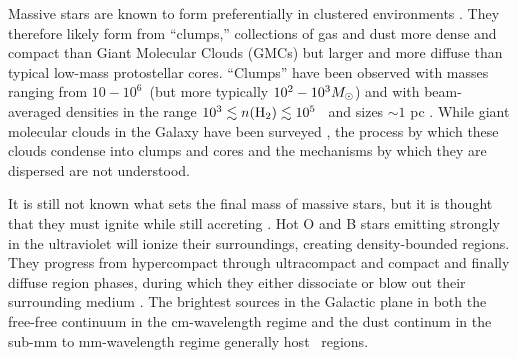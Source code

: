 
Massive stars are known to form preferentially in clustered environments
\citep{DeWit2005}.  They therefore likely form from ``clumps,'' collections of
gas and dust more dense and compact than Giant Molecular Clouds (GMCs) but larger and
more diffuse than typical low-mass protostellar cores.  ``Clumps'' have been
observed with masses ranging from $10-10^6$\msun\ (but more typically
$10^2-10^3M_{\odot}$) and with beam-averaged densities in the range $10^3 \lesssim n(\textrm{H}_{2}) \lesssim
10^5$ \percc\ and sizes $\sim1$ pc \citep[e.g., ][]{Rosolowsky2010,Dunham2010}.
While giant molecular clouds  in the Galaxy have been surveyed
\citep[e.g., ][]{Jackson2006}, the process by which these clouds condense into
clumps and cores and the mechanisms by which they are dispersed are not
understood. 

It is still not known what sets the final mass of massive stars, but it
is thought that they must ignite while still accreting
\citep{mckee2007}.  Hot O and B stars emitting strongly in the ultraviolet will
ionize their surroundings, creating density-bounded  regions.  They
progress from hypercompact through ultracompact and compact and finally diffuse
 region phases, during which they either dissociate or blow out their
surrounding medium \citep{Churchwell2002,keto2007}.  The brightest sources in the
Galactic plane in both the free-free continuum in the cm-wavelength regime and
the dust continum in the sub-mm to mm-wavelength regime generally host \uchii\
regions.


